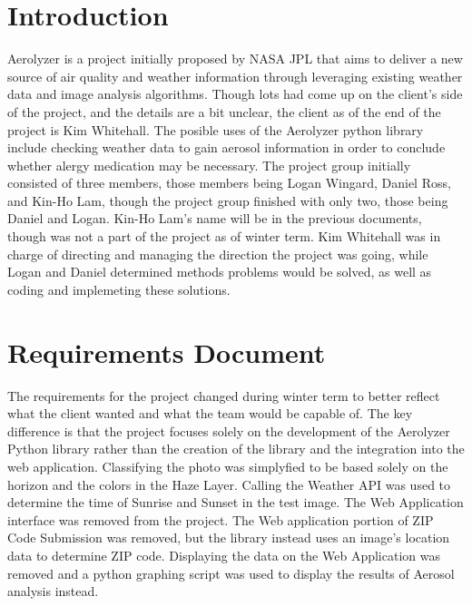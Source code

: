 \documentclass[onecolumn, draftclsnofoot,10pt, compsoc]{IEEEtran}
\begin{document}
\tableofcontents
\clearpage

\begin{singlespace}

	\section{Introduction}
		Aerolyzer is a project initially proposed by NASA JPL that aims to deliver a new source of air quality and weather information through leveraging existing weather data and image analysis algorithms.
		Though lots had come up on the client's side of the project, and the details are a bit unclear, the client as of the end of the project is Kim Whitehall.
		The posible uses of the Aerolyzer python library include checking weather data to gain aerosol information in order to conclude whether alergy medication may be necessary.
		The project group initially consisted of three members, those members being Logan Wingard, Daniel Ross, and Kin-Ho Lam, though the project group finished with only two, those being Daniel and Logan.
		Kin-Ho Lam's name will be in the previous documents, though was not a part of the project as of winter term.
		Kim Whitehall was in charge of directing and managing the direction the project was going, while Logan and Daniel determined methods problems would be solved, as well as coding and implemeting these solutions.
		
	\section{Requirements Document}
		
		The requirements for the project changed during winter term to better reflect what the client wanted and what the team would be capable of.
		The key difference is that the project focuses solely on the development of the Aerolyzer Python library rather than the creation of the library and the integration into the web application.
		Classifying the photo was simplyfied to be based solely on the horizon and the colors in the Haze Layer.
		Calling the Weather API was used to determine the time of Sunrise and Sunset in the test image.
		The Web Application interface was removed from the project.
		The Web application portion of ZIP Code Submission was removed, but the library instead uses an image's location data to determine ZIP code.
		Displaying the data on the Web Application was removed and a python graphing script was used to display the results of Aerosol analysis instead.
		

\end{singlespace}
\end{document}
